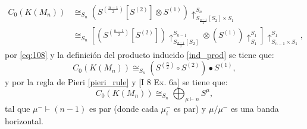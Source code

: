 \documentclass[12pt]{book}
\theoremstyle{definition}
\newcounter{in}
\newcounter{ini}
\begin{document}
\begin{equation}
\begin{aligned}
C_{0}(K(M_{n})) & \cong_{S_{n}} (S^{(\frac{n-1}{2})} \left [ S^{(2)} \right ] \otimes S^{(1)})\uparrow_{S_{\frac{n-1}{2}} \left [ S_{2} \right ] \times S_{1}}^{S_{n}} \\
& \cong_{S_{n}} \left [ (S^{(\frac{n-1}{2})} \left [ S^{(2)} \right ])\uparrow_{S_{\frac{n-1}{2}} \left [ S_{2} \right ]}^{S_{n-1}} \otimes (S^{(1)})\uparrow_{S_{1}}^{S_{1}} \right ] \uparrow_{S_{n-1} \times S_{1}}^{S_{1}},
\end{aligned}
\end{equation} 
por \ref{eq:108} y la definición del producto inducido \ref{ind_prod} se tiene que:
\begin{equation}
C_{0}(K(M_{n})) \cong_{S_{n}} (S^{(\frac{n}{2})} \circ S^{(2)} ) \bullet S^{(1)},
\end{equation} 
y por la regla de Pieri \ref{pieri_rule} y \cite{macdonald1998symmetric} [I 8 Ex. 6a] se tiene que:
\begin{equation}
  \label{eq:112}
   C_{0}(K(M_n)) \cong_{S_{n}} \bigoplus_{\mu \vdash n} S^{\mu},
\end{equation}
tal que $\mu^{-} \vdash (n-1)$ es par (donde cada $\mu_{i}^{-}$ es par) y $\mu / \mu^{-}$ es una banda horizontal.
\end{document}
